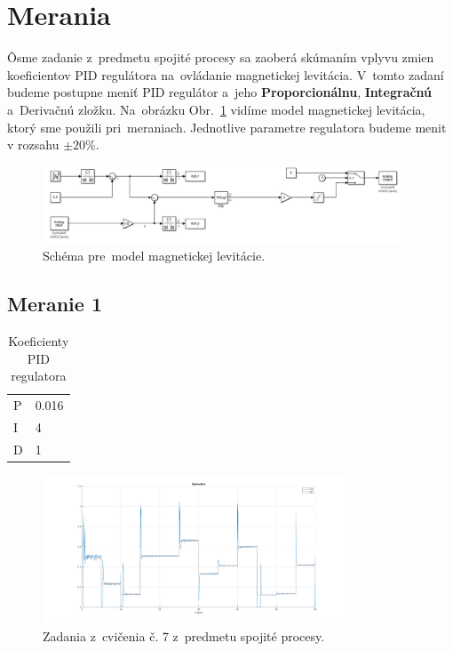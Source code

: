 \documentclass{article}
\begin{document}
\clearpage

\section{Merania}
\label{sec:merania}

Ôsme zadanie z~predmetu spojité procesy sa zaoberá skúmaním vplyvu zmien koeficientov PID regulátora
na~ovládanie magnetickej levitácia. V~tomto zadaní budeme postupne meniť PID regulátor a~jeho \textbf{Proporcionálnu},
\textbf{Integračnú} a~Derivačnú zložku. Na~obrázku Obr.~\ref{fig:schema} vidíme model magnetickej levitácia,
ktorý sme použili pri~meraniach. Jednotlive parametre regulatora budeme menit v rozsahu $\pm20\%$.

\begin{figure}[!htbp]
	\begin{center}
		\includegraphics[width=0.95\textwidth]{include/schema.png}
	\end{center}
	\caption{Schéma pre~model magnetickej levitácie.}
	\label{fig:schema}
\end{figure}

\subsection{Meranie 1}
\label{sec:meranie1}

\begin{table}[!htbp]
	\caption{Koeficienty PID regulatora}
	\label{tab:t1}
	\begin{center}
		\begin{tabular}[c]{|l|l|}
			\hline

			P & 0.016 \\
			I & 4 \\
			D & 1 \\
			\hline
		\end{tabular}
	\end{center}
\end{table}

\begin{figure}[!htbp]
	\begin{center}
		\includegraphics[width=0.8\textwidth]{./include/m1.png}
	\end{center}
	\caption{Zadania z~cvičenia č. 7 z~predmetu spojité procesy.}
	\label{fig:meranie1}
\end{figure}
\end{document}

